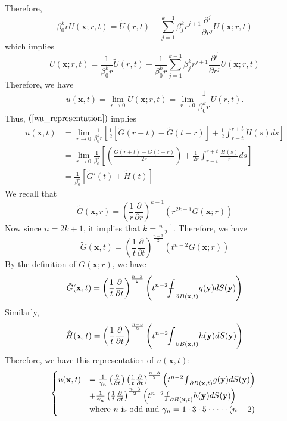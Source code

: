 \documentclass[10pt]{article}
\def\vc{{\mathbf x}}
\def\vcc{{\mathbf y}}
\def\wa{{\tilde U}}
\newcommand\tbbint{{-\mkern -16mu\int}}
\newcommand\dbbint{{-\mkern -19mu\int}}
\newcommand\bbint{
{\mathchoice{\dbbint}{\tbbint}{\tbbint}{\tbbint}}
}
\begin{document}
Therefore,
\begin{equation*}
    \beta_0^k r U(\vc;r,t) = \wa(r,t) - \sum_{j=1}^{k-1} \beta_j^k r^{j+1}\frac{\partial^j}{\partial r^j}U(\vc;r,t)
\end{equation*}
which implies
\begin{equation*}
    U(\vc;r,t) = \frac{1}{\beta_0^k r}\wa(r,t) - \frac{1}{\beta_0^k r}\sum_{j=1}^{k-1} \beta_j^k r^{j+1}\frac{\partial^j}{\partial r^j}U(\vc;r,t)
\end{equation*}
Therefore, we have
\begin{equation*}
    u(\vc,t) = \lim_{r \to 0} U(\vc;r,t) = \lim_{r \to 0} \frac{1}{\beta_0^k r}\wa(r,t).
\end{equation*}
Thus, $(\ref{wa_representation})$ implies
\begin{align*}
    u(\vc,t) &= \lim_{r \to 0} \frac{1}{\beta_0^k r}\left[\frac{1}{2}\left[\tilde{G}(r+t)-\tilde{G}(t-r)\right]+\frac{1}{2}\int_{r-t}^{r+t}\tilde{H}(s)ds\right]\\
             &= \lim_{r \to 0} \frac{1}{\beta_0^k} \left[\left(\frac{\tilde{G}(r+t)-\tilde{G}(t-r)}{2r}\right)+\frac{1}{2r}\int_{r-t}^{r+t}\frac{\tilde{H}(s)}{r}ds\right]\\
             &=\frac{1}{\beta_0^k}[\tilde{G}'(t)+\tilde{H}(t)]
\end{align*}
We recall that 
\begin{equation*}
    \tilde{G}(\vc,r) = \left(\frac{1}{r}\frac{\partial}{\partial r}\right)^{k-1}(r^{2k-1}G(\vc;r))
\end{equation*}
Now since $n=2k+1$, it implies that $k=\frac{n-1}{2}$. Therefore, we have
\begin{equation*}
    \tilde{G}(\vc,t) = \left(\frac{1}{t}\frac{\partial}{\partial t}\right)^{\frac{n-3}{2}}(t^{n-2}G(\vc;r))
\end{equation*}
By the definition of $G(\vc;r)$, we have
\begin{equation*}
    \tilde{G}(\vc,t) = \left(\frac{1}{t}\frac{\partial}{\partial t}\right)^{\frac{n-3}{2}}\left(t^{n-2}\bbint_{\partial B(\vc,t)}g(\vcc)d S(\vcc)\right)
\end{equation*}
Similarly,
\begin{equation*}
    \tilde{H}(\vc,t) = \left(\frac{1}{t}\frac{\partial}{\partial t}\right)^{\frac{n-3}{2}}\left(t^{n-2}\bbint_{\partial B(\vc,t)}h(\vcc)d S(\vcc)\right)
\end{equation*}
Therefore, we have this representation of $u(\vc,t)$:
\begin{equation}
    \label{u_representation2}
    \begin{cases}
    u(\vc,t) &= \frac{1}{\gamma_n}\left(\frac{\partial}{\partial t}\right)\left(\frac{1}{t}\frac{\partial}{\partial t}\right)^{\frac{n-3}{2}} \left(t^{n-2}\bbint_{\partial B(\vc,t)}g(\vcc)d S(\vcc)\right)  \\
    &+\frac{1}{\gamma_n}\left(\frac{1}{t}\frac{\partial}{\partial t}\right)^{\frac{n-3}{2}}\left(t^{n-2}\bbint_{\partial B(\vc,t)}h(\vcc)d S(\vcc)\right) \\
    &\text{where $n$ is odd and $\gamma_n = 1\cdot 3\cdot 5\cdot\cdot\cdot\cdot\cdot(n-2)$ }
    \end{cases}
\end{equation}
\end{document}
